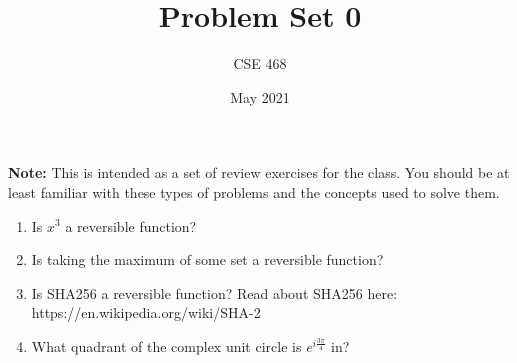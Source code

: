 \documentclass[12pt]{article}
\title{Problem Set 0}
\author{CSE 468}
\date{May 2021}
\begin{document}
\maketitle

\noindent \textbf{Note:} This is intended as a set of review exercises for the class. You should be at least familiar with these types of problems and the concepts used to solve them.

\begin{enumerate}[font=\bfseries]
    \item Is $x^3$ a reversible function?
    \item Is taking the maximum of some set a reversible function?
    \item Is SHA256 a reversible function? Read about SHA256 here: https://en.wikipedia.org/wiki/SHA-2
    \item What quadrant of the complex unit circle is $e^{i\frac{3\pi}{4}}$ in?
    
\end{enumerate}
\end{document}
